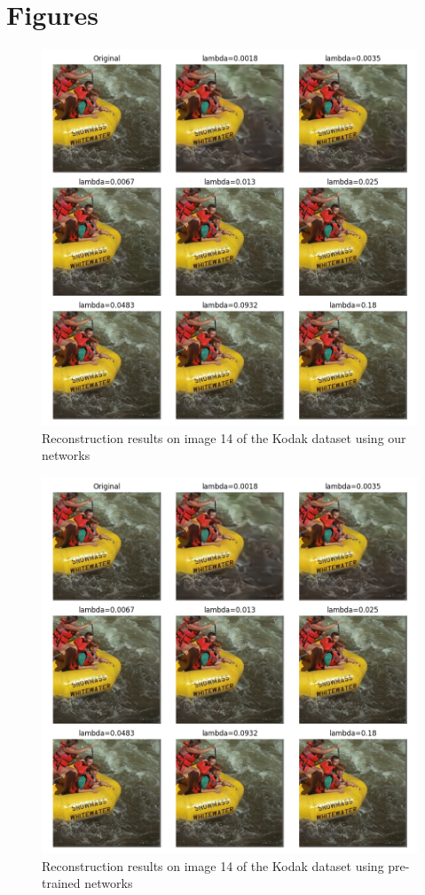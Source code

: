 \appendix

\chapter{Figures}

\begin{figure}
    \centering
    \includegraphics[width=15cm]{img/balle_bdpsnr_1a.png}
    \caption{Reconstruction results on image 14 of the Kodak dataset using our networks}
    \label{bdpsnr_1a_app}
\end{figure}

\begin{figure}
    \centering
    \includegraphics[width=15cm]{img/balle_bdpsnr_1b.png}
    \caption{Reconstruction results on image 14 of the Kodak dataset using pre-trained networks}
    \label{bdpsnr_1b_app}
\end{figure}

